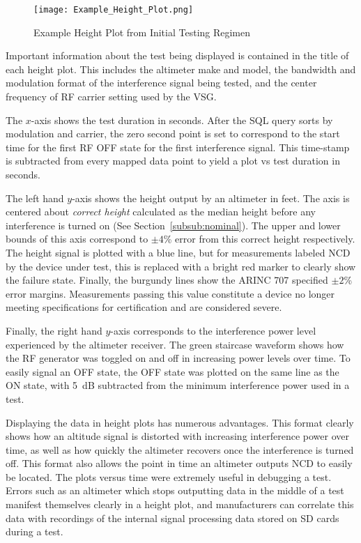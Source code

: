 \begin{figure}[h!]
	\centering
	\texttt{[image: Example\_Height\_Plot.png]}
	\caption{Example Height Plot from Initial Testing Regimen}
	\label{fig:height_plot_example}
\end{figure}
Important information about the test being displayed is contained in the title of each height plot. This includes the altimeter make and model, the bandwidth and modulation format of the interference signal being tested, and the center frequency of RF carrier setting used by the VSG.

The $x$-axis shows the test duration in seconds. After the SQL query sorts by modulation and carrier, the zero second point is set to correspond to the start time for the first RF OFF state for the first interference signal. This time-stamp is subtracted from every mapped data point to yield a plot vs test duration in seconds.

The left hand $y$-axis shows the height output by an altimeter in feet. The axis is centered about \textit{correct height} calculated as the median height before any interference is turned on (See Section~\ref{subsub:nominal}). The upper and lower bounds of this axis correspond to $\pm4$\% error from this correct height respectively. The height signal is plotted with a blue line, but for measurements labeled NCD by the device under test, this is replaced with a bright red marker to clearly show the failure state. Finally, the burgundy lines show the ARINC 707 specified $\pm2$\% error margins. Measurements passing this value constitute a device no longer meeting specifications for certification and are considered severe.  

Finally, the right hand $y$-axis corresponds to the interference power level experienced by the altimeter receiver. The green staircase waveform shows how the RF generator was toggled on and off in increasing power levels over time. To easily signal an OFF state, the OFF state was plotted on the same line as the ON state, with 5~dB subtracted from the minimum interference power used in a test. 

Displaying the data in height plots has numerous advantages. This format clearly shows how an altitude signal is distorted with increasing interference power over time, as well as how quickly the altimeter recovers once the interference is turned off. This format also allows the point in time an altimeter outputs NCD to easily be located. The plots versus time were extremely useful in debugging a test. Errors such as an altimeter which stops outputting data in the middle of a test manifest themselves clearly in a height plot, and manufacturers can correlate this data with recordings of the internal signal processing data stored on SD cards during a test.  

